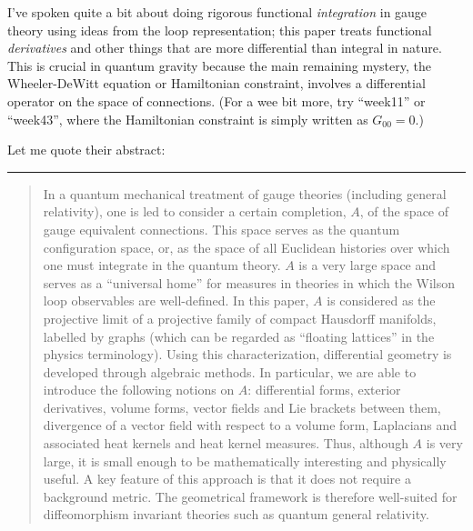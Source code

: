 \documentclass{article}
\def\tightlist{}
\renewcommand{\texttt}[1]{%
  \begingroup
  \ttfamily
  \begingroup\lccode`~=`/\lowercase{\endgroup\def~}{/\discretionary{}{}{}}%
  \begingroup\lccode`~=`[\lowercase{\endgroup\def~}{[\discretionary{}{}{}}%
  \begingroup\lccode`~=`.\lowercase{\endgroup\def~}{.\discretionary{}{}{}}%
  \catcode`/=\active\catcode`[=\active\catcode`.=\active
  \scantokens{#1\noexpand}%
  \endgroup
}
\begin{document}

I've spoken quite a bit about doing rigorous functional
\emph{integration} in gauge theory using ideas from the loop
representation; this paper treats functional \emph{derivatives} and
other things that are more differential than integral in nature. This is
crucial in quantum gravity because the main remaining mystery, the
Wheeler-DeWitt equation or Hamiltonian constraint, involves a
differential operator on the space of connections. (For a wee bit more,
try ``week11'' or ``week43'', where the Hamiltonian constraint is simply
written as \(G_{00} = 0\).)

Let me quote their abstract:

\begin{center}\rule{0.5\linewidth}{0.5pt}\end{center}

\begin{quote}
In a quantum mechanical treatment of gauge theories (including general
relativity), one is led to consider a certain completion, \(A\), of the
space of gauge equivalent connections. This space serves as the quantum
configuration space, or, as the space of all Euclidean histories over
which one must integrate in the quantum theory. \(A\) is a very large
space and serves as a ``universal home'' for measures in theories in
which the Wilson loop observables are well-defined. In this paper, \(A\)
is considered as the projective limit of a projective family of compact
Hausdorff manifolds, labelled by graphs (which can be regarded as
``floating lattices'' in the physics terminology). Using this
characterization, differential geometry is developed through algebraic
methods. In particular, we are able to introduce the following notions
on \(A\): differential forms, exterior derivatives, volume forms, vector
fields and Lie brackets between them, divergence of a vector field with
respect to a volume form, Laplacians and associated heat kernels and
heat kernel measures. Thus, although \(A\) is very large, it is small
enough to be mathematically interesting and physically useful. A key
feature of this approach is that it does not require a background
metric. The geometrical framework is therefore well-suited for
diffeomorphism invariant theories such as quantum general relativity.
\end{quote}
\end{document}
